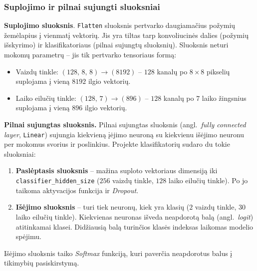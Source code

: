 \subsubsection{Suplojimo ir pilnai sujungti sluoksniai}
\label{subsubsec:suplojimas_ir_pilnai_sujungtas}

\textbf{Suplojimo sluoksnis}. \texttt{Flatten} sluoksnis pertvarko daugiamačius požymių žemėlapius į vienmatį vektorių. Jis yra tiltas tarp konvoliucinės dalies (požymių išskyrimo) ir klasifikatoriaus (pilnai sujungtų sluoksnių). Sluoksnis neturi mokomų parametrų – jis tik pertvarko tensoriaus formą:
\begin{itemize}
    \item Vaizdų tinkle: $(128,\, 8,\, 8) \to (8192)$ – $128$ kanalų po $8 \times 8$ pikselių suplojama į vieną $8192$ ilgio vektorių.
    \item Laiko eilučių tinkle: $(128,\, 7) \to (896)$ – $128$ kanalų po $7$ laiko žingsnius suplojama į vieną $896$ ilgio vektorių.
\end{itemize}

\textbf{Pilnai sujungtas sluoksnis.} Pilnai sujungtas sluoksnis (angl.~\textit{fully connected layer}, \texttt{Linear}) sujungia kiekvieną įėjimo neuroną su kiekvienu išėjimo neuronu per mokomus svorius ir poslinkius. Projekte klasifikatorių sudaro du tokie sluoksniai:
\begin{enumerate}
    \item \textbf{Paslėptasis sluoksnis} – mažina suploto vektoriaus dimensiją iki \texttt{classifier\_hidden\_size} ($256$ vaizdų tinkle, $128$ laiko eilučių tinkle). Po jo taikoma aktyvacijos funkcija ir \textit{Dropout}.
    \item \textbf{Išėjimo sluoksnis} – turi tiek neuronų, kiek yra klasių ($2$ vaizdų tinkle, $30$ laiko eilučių tinkle). Kiekvienas neuronas išveda neapdorotą balą (angl.~\textit{logit}) atitinkamai klasei. Didžiausią balą turinčios klasės indeksas laikomas modelio spėjimu.
\end{enumerate}

Išėjimo sluoksnis taiko \textit{Softmax} funkciją, kuri paverčia neapdorotus balus į tikimybių pasiskirstymą.
